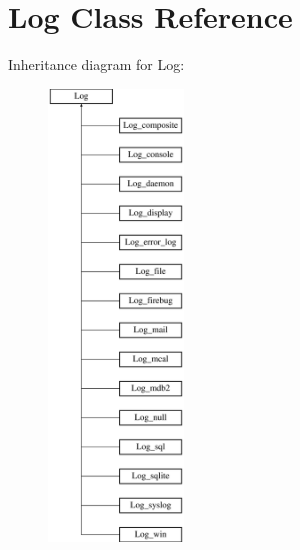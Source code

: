 \hypertarget{class_log}{
\section{Log Class Reference}
\label{class_log}
}
Inheritance diagram for Log:\begin{figure}[H]
\begin{center}
\leavevmode
\includegraphics[height=12.000000cm]{class_log}
\end{center}
\end{figure}
